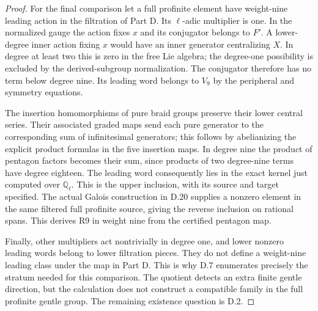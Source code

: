 \begin{proof}
For the final comparison let a full profinite element have
weight-nine leading action in the filtration of Part D.
Its $\ell$-adic multiplier is one. In the normalized gauge
the action fixes $x$ and its conjugator belongs to $F'$.
A lower-degree inner action fixing $x$ would have an inner
generator centralizing $X$. In degree at least two this is
zero in the free Lie algebra; the degree-one possibility is
excluded by the derived-subgroup normalization. The conjugator
therefore has no term below degree nine. Its leading word
belongs to $V_9$ by the peripheral and symmetry equations.

The insertion homomorphisms of pure braid groups preserve
their lower central series. Their associated graded maps
send each pure generator to the corresponding sum of
infinitesimal generators; this follows by abelianizing the
explicit product formulas in the five insertion maps.
In degree nine the product of pentagon factors becomes their
sum, since products of two degree-nine terms have degree
eighteen. The leading word consequently lies in the exact
kernel just computed over $\mathbb Q_\ell$. This is the
upper inclusion, with its source and target specified.
The actual Galois construction in D.20 supplies a nonzero
element in the same filtered full profinite source, giving
the reverse inclusion on rational spans. This derives R9 in
weight nine from the certified pentagon map.

Finally, other multipliers act nontrivially in degree one,
and lower nonzero leading words belong to lower filtration
pieces. They do not define a weight-nine leading class under
the map in Part D. This is why D.7 enumerates precisely the
stratum needed for this comparison. The quotient detects
an extra finite gentle direction, but the calculation does
not construct a compatible family in the full profinite
gentle group. The remaining existence question is D.2.
\end{proof}
